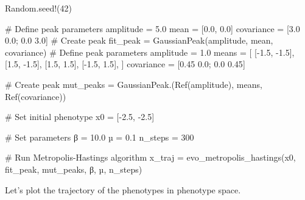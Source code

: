 \documentclass[
]{scrartcl}
\newenvironment{Shaded}{\begin{snugshade}}{\end{snugshade}}
\newcommand{\BuiltInTok}[1]{\textcolor[rgb]{0.00,0.23,0.31}{#1}}
\newcommand{\CommentTok}[1]{\textcolor[rgb]{0.37,0.37,0.37}{#1}}
\newcommand{\FloatTok}[1]{\textcolor[rgb]{0.68,0.00,0.00}{#1}}
\newcommand{\FunctionTok}[1]{\textcolor[rgb]{0.28,0.35,0.67}{#1}}
\newcommand{\NormalTok}[1]{\textcolor[rgb]{0.00,0.23,0.31}{#1}}
\newcommand{\OperatorTok}[1]{\textcolor[rgb]{0.37,0.37,0.37}{#1}}
\begin{document}
\begin{Shaded}
\begin{Highlighting}[]
\BuiltInTok{Random}\NormalTok{.}\FunctionTok{seed!}\NormalTok{(}\FloatTok{42}\NormalTok{)}

\CommentTok{\# Define peak parameters}
\NormalTok{amplitude }\OperatorTok{=} \FloatTok{5.0}
\NormalTok{mean }\OperatorTok{=}\NormalTok{ [}\FloatTok{0.0}\NormalTok{, }\FloatTok{0.0}\NormalTok{]}
\NormalTok{covariance }\OperatorTok{=}\NormalTok{ [}\FloatTok{3.0} \FloatTok{0.0}\NormalTok{; }\FloatTok{0.0} \FloatTok{3.0}\NormalTok{]}
\CommentTok{\# Create peak}
\NormalTok{fit\_peak }\OperatorTok{=} \FunctionTok{GaussianPeak}\NormalTok{(amplitude, mean, covariance)}
\CommentTok{\# Define peak parameters}
\NormalTok{amplitude }\OperatorTok{=} \FloatTok{1.0}
\NormalTok{means }\OperatorTok{=}\NormalTok{ [}
\NormalTok{    [}\OperatorTok{{-}}\FloatTok{1.5}\NormalTok{, }\OperatorTok{{-}}\FloatTok{1.5}\NormalTok{],}
\NormalTok{    [}\FloatTok{1.5}\NormalTok{, }\OperatorTok{{-}}\FloatTok{1.5}\NormalTok{],}
\NormalTok{    [}\FloatTok{1.5}\NormalTok{, }\FloatTok{1.5}\NormalTok{],}
\NormalTok{    [}\OperatorTok{{-}}\FloatTok{1.5}\NormalTok{, }\FloatTok{1.5}\NormalTok{],}
\NormalTok{]}
\NormalTok{covariance }\OperatorTok{=}\NormalTok{ [}\FloatTok{0.45} \FloatTok{0.0}\NormalTok{; }\FloatTok{0.0} \FloatTok{0.45}\NormalTok{]}

\CommentTok{\# Create peak}
\NormalTok{mut\_peaks }\OperatorTok{=} \FunctionTok{GaussianPeak}\NormalTok{.(}\FunctionTok{Ref}\NormalTok{(amplitude), means, }\FunctionTok{Ref}\NormalTok{(covariance))}

\CommentTok{\# Set initial phenotype}
\NormalTok{x0 }\OperatorTok{=}\NormalTok{ [}\OperatorTok{{-}}\FloatTok{2.5}\NormalTok{, }\OperatorTok{{-}}\FloatTok{2.5}\NormalTok{]}

\CommentTok{\# Set parameters}
\NormalTok{β }\OperatorTok{=} \FloatTok{10.0}
\NormalTok{µ }\OperatorTok{=} \FloatTok{0.1}
\NormalTok{n\_steps }\OperatorTok{=} \FloatTok{300}

\CommentTok{\# Run Metropolis{-}Hastings algorithm}
\NormalTok{x\_traj }\OperatorTok{=} \FunctionTok{evo\_metropolis\_hastings}\NormalTok{(x0, fit\_peak, mut\_peaks, β, µ, n\_steps)}
\end{Highlighting}
\end{Shaded}

Let's plot the trajectory of the phenotypes in phenotype space.
\end{document}
